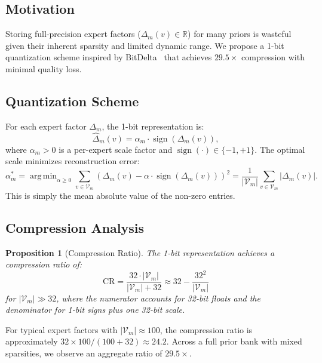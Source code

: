\documentclass[11pt]{article}
\newtheorem{proposition}[theorem]{Proposition}
\DeclareMathOperator*{\argmin}{arg\,min}
\DeclareMathOperator{\sign}{sign}
\begin{document}
\subsection{Motivation}

Storing full-precision expert factors ($\Delta_m(v) \in \mathbb{R}$) for many
priors is wasteful given their inherent sparsity and limited dynamic range. We
propose a 1-bit quantization scheme inspired by
BitDelta~\cite{liu2024bitdelta} that achieves $29.5\times$ compression with
minimal quality loss.

\subsection{Quantization Scheme}

For each expert factor $\Delta_m$, the 1-bit representation is:
\begin{equation}
    \widehat{\Delta}_m(v) = \alpha_m \cdot \sign(\Delta_m(v)),
    \label{eq:1bit}
\end{equation}
where $\alpha_m > 0$ is a per-expert scale factor and $\sign(\cdot) \in \{-1, +1\}$.
The optimal scale minimizes reconstruction error:
\begin{equation}
    \alpha_m^* = \argmin_{\alpha \geq 0} \sum_{v \in \mathcal{V}_m}
    \left(\Delta_m(v) - \alpha \cdot \sign(\Delta_m(v))\right)^2
    = \frac{1}{|\mathcal{V}_m|} \sum_{v \in \mathcal{V}_m} |\Delta_m(v)|.
\end{equation}
This is simply the mean absolute value of the non-zero entries.

\subsection{Compression Analysis}

\begin{proposition}[Compression Ratio]
The 1-bit representation achieves a compression ratio of:
\begin{equation}
    \text{CR} = \frac{32 \cdot |\mathcal{V}_m|}{|\mathcal{V}_m| + 32} \approx 32 - \frac{32^2}{|\mathcal{V}_m|}
\end{equation}
for $|\mathcal{V}_m| \gg 32$, where the numerator accounts for 32-bit floats
and the denominator for 1-bit signs plus one 32-bit scale.
\end{proposition}

For typical expert factors with $|\mathcal{V}_m| \approx 100$, the compression
ratio is approximately $32 \times 100 / (100 + 32) \approx 24.2$. Across a full
prior bank with mixed sparsities, we observe an aggregate ratio of $29.5\times$.
\end{document}
